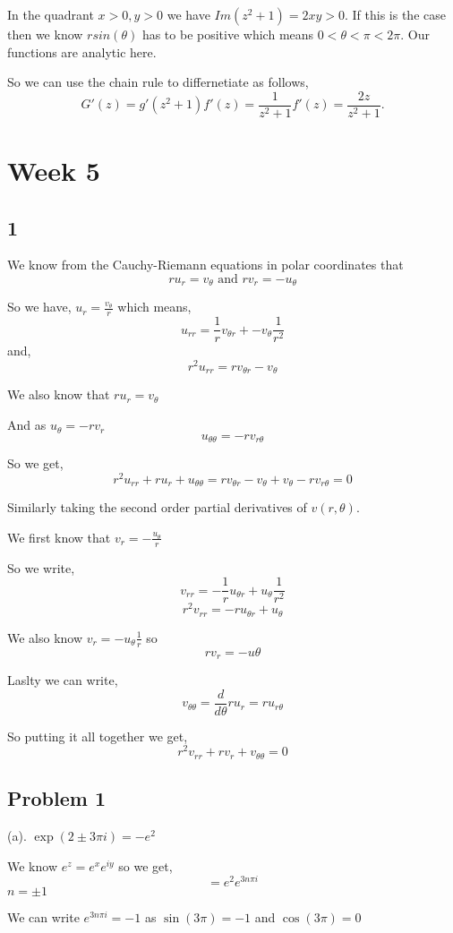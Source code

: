\documentclass[a4paper]{report}
\begin{document}
In the quadrant $x> 0, y > 0$ we have $Im(z^2 + 1) = 2xy > 0$. If this is the case then we know $rsin(\theta)$ has to be positive which means $ 0 < \theta < \pi < 2\pi$. Our functions are analytic here. 

So we can use the chain rule to differnetiate as follows, \[
G'(z) = g'(z^2 + 1) f'(z) = \frac{1}{z^2 + 1} f'(z)  = \frac{2z}{z^2 + 1}
.\] 


\section*{Week 5}
\subsection*{1}
We know from the Cauchy-Riemann equations in polar coordinates that $$ru_r = v_{\theta} \text{ and }  r v_r = -u_{\theta}$$

So we have, $u_r = \frac{v_\theta}{r}$ which means, 
$$ u_{rr} = \frac{1}{r}v_{\theta r} + -v_{\theta}\frac{1}{r^2}  $$ 
and, $$ r^2u_{rr} = r v_{\theta r} -v_{\theta} $$ 

We also know that $ru_r = v_\theta$

And as $u_\theta = -rv_r$ $$ u_{\theta\theta} = -rv_{r\theta}$$ 

So we get, $$ r^2u_{rr} + ru_r + u_{\theta\theta} = rv_{\theta r} - v_\theta + v_\theta -rv_{r \theta} = 0 $$ 

Similarly taking the second order partial derivatives of $v(r,\theta)$.

We first know that $v_r = -\frac{u_\theta}{r}$ 

So we write, $$ v_{rr} =  -\frac{1}{r} u_{\theta r} + u_\theta \frac{1}{r^2}$$ 
$$ r^2v_{rr} = -ru_{\theta r} + u_\theta $$ 

We also know $v_r = -u_\theta \frac{1}{r}$ so $$ rv_r = -u \theta $$ 

Laslty we can write, $$ v_{\theta\theta} = \frac{d}{d\theta} r u_r = r u_{r\theta} $$ 

So putting it all together we get, $$ r^2v_{rr} + rv_r + v_{\theta\theta} = 0 $$ 

\subsection*{Problem 1}
(a). $\exp(2 \pm 3\pi i) = -e^2$ 

We know $e^z = e^x e^{iy}$ so we get, $$ =e^2 e^{3n\pi i} $$ $n = \pm 1$ 

We can write $e^{3n\pi i} = -1$ as  $\sin(3\pi) = -1$ and  $\cos(3\pi) = 0$
\end{document}
